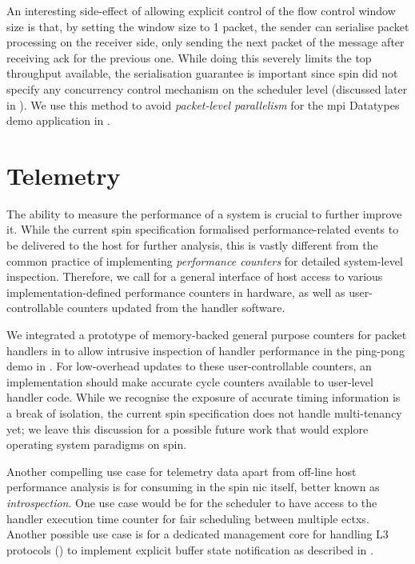 An interesting side-effect of allowing explicit control of the flow control window size is that, by setting the window size to 1 packet, the sender can serialise packet processing on the receiver side, only sending the next packet of the message after receiving \ac{ack} for the previous one.  While doing this severely limits the top throughput available, the serialisation guarantee is important since \ac{spin} did not specify any concurrency control mechanism on the scheduler level (discussed later in ).  We use this method to avoid \emph{packet-level parallelism} for the \ac{mpi} Datatypes demo application in .

\section{Telemetry} \label{sec:telemetry-introspection}

The ability to measure the performance of a system is crucial to further improve it.  While the current \ac{spin} specification formalised performance-related events to be delivered to the host for further analysis, this is vastly different from the common practice of implementing \emph{performance counters} for detailed system-level inspection.  Therefore, we call for a general interface of host access to various implementation-defined performance counters in hardware, as well as user-controllable counters updated from the handler software.

We integrated a prototype of memory-backed general purpose counters for packet handlers in  to allow intrusive inspection of handler performance in the ping-pong demo in .  For low-overhead updates to these user-controllable counters, an implementation should make accurate cycle counters available to user-level handler code.  While we recognise the exposure of accurate timing information is a break of isolation, the current \ac{spin} specification does not handle multi-tenancy yet; we leave this discussion for a possible future work that would explore operating system paradigms on \ac{spin}.

Another compelling use case for telemetry data apart from off-line host performance analysis is for consuming in the \ac{spin} \ac{nic} itself, better known as \emph{introspection}.  One use case would be for the scheduler to have access to the handler execution time counter for fair scheduling between multiple \ac{ectx}s.  Another possible use case is for a dedicated management core for handling L3 protocols () to implement explicit buffer state notification as described in .

